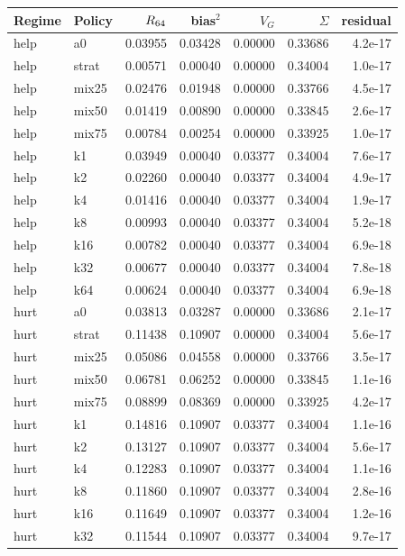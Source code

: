 \begin{table}[h]\centering\small
\begin{tabular}{llrrrrr}
\toprule
Regime & Policy & $R_{64}$ & bias$^2$ & $V_G$ & $\Sigma$ & residual \\
\midrule
help & a0 & 0.03955 & 0.03428 & 0.00000 & 0.33686 & 4.2e-17 \\
help & strat & 0.00571 & 0.00040 & 0.00000 & 0.34004 & 1.0e-17 \\
help & mix25 & 0.02476 & 0.01948 & 0.00000 & 0.33766 & 4.5e-17 \\
help & mix50 & 0.01419 & 0.00890 & 0.00000 & 0.33845 & 2.6e-17 \\
help & mix75 & 0.00784 & 0.00254 & 0.00000 & 0.33925 & 1.0e-17 \\
help & k1 & 0.03949 & 0.00040 & 0.03377 & 0.34004 & 7.6e-17 \\
help & k2 & 0.02260 & 0.00040 & 0.03377 & 0.34004 & 4.9e-17 \\
help & k4 & 0.01416 & 0.00040 & 0.03377 & 0.34004 & 1.9e-17 \\
help & k8 & 0.00993 & 0.00040 & 0.03377 & 0.34004 & 5.2e-18 \\
help & k16 & 0.00782 & 0.00040 & 0.03377 & 0.34004 & 6.9e-18 \\
help & k32 & 0.00677 & 0.00040 & 0.03377 & 0.34004 & 7.8e-18 \\
help & k64 & 0.00624 & 0.00040 & 0.03377 & 0.34004 & 6.9e-18 \\
hurt & a0 & 0.03813 & 0.03287 & 0.00000 & 0.33686 & 2.1e-17 \\
hurt & strat & 0.11438 & 0.10907 & 0.00000 & 0.34004 & 5.6e-17 \\
hurt & mix25 & 0.05086 & 0.04558 & 0.00000 & 0.33766 & 3.5e-17 \\
hurt & mix50 & 0.06781 & 0.06252 & 0.00000 & 0.33845 & 1.1e-16 \\
hurt & mix75 & 0.08899 & 0.08369 & 0.00000 & 0.33925 & 4.2e-17 \\
hurt & k1 & 0.14816 & 0.10907 & 0.03377 & 0.34004 & 1.1e-16 \\
hurt & k2 & 0.13127 & 0.10907 & 0.03377 & 0.34004 & 5.6e-17 \\
hurt & k4 & 0.12283 & 0.10907 & 0.03377 & 0.34004 & 1.1e-16 \\
hurt & k8 & 0.11860 & 0.10907 & 0.03377 & 0.34004 & 2.8e-16 \\
hurt & k16 & 0.11649 & 0.10907 & 0.03377 & 0.34004 & 1.2e-16 \\
hurt & k32 & 0.11544 & 0.10907 & 0.03377 & 0.34004 & 9.7e-17 \\

\end{tabular}
\end{table}
